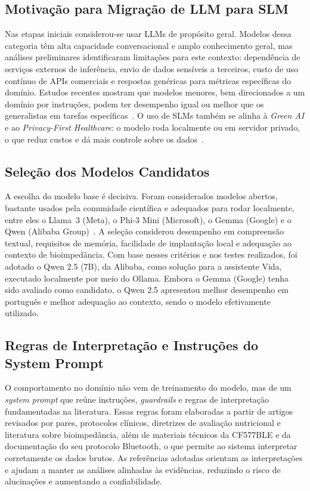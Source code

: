\subsection{Motivação para Migração de LLM para SLM}

Nas etapas iniciais considerou-se usar LLMs de propósito geral. Modelos dessa categoria têm
alta capacidade conversacional e amplo conhecimento geral, mas análises preliminares
identificaram limitações para este contexto: dependência de serviços externos de inferência,
envio de dados sensíveis a terceiros, custo de uso contínuo de APIs comerciais e respostas
genéricas para métricas específicas do domínio. Estudos recentes mostram que modelos menores,
bem direcionados a um domínio por instruções, podem ter desempenho igual ou melhor que os
generalistas em
tarefas específicas~\cite{abdin2024,gemma2024,bai2023}. O uso de SLMs também se alinha à
\emph{Green AI} e ao \emph{Privacy-First Healthcare}: o modelo roda localmente ou em
servidor privado, o que reduz custos e dá mais controle sobre os dados~\cite{schwartz2020,etic2024}.

\subsection{Seleção dos Modelos Candidatos}

A escolha do modelo base é decisiva. Foram considerados modelos abertos, bastante usados
pela comunidade científica e adequados para rodar localmente, entre eles o Llama~3 (Meta),
o Phi-3 Mini (Microsoft), o Gemma (Google) e o Qwen (Alibaba
Group)~\cite{touvron2024,abdin2024,gemma2024,bai2023}. A seleção considerou desempenho em
compreensão textual, requisitos de memória, facilidade de implantação local e adequação ao
contexto de bioimpedância. Com base nesses critérios e nos testes realizados, foi adotado o
Qwen 2.5 (7B), da Alibaba, como solução para a assistente Vida, executado localmente por
meio do Ollama. Embora o Gemma (Google) tenha sido avaliado como candidato, o Qwen 2.5
apresentou melhor desempenho em português e melhor adequação ao contexto, sendo o modelo
efetivamente utilizado.

\subsection{Regras de Interpretação e Instruções do System Prompt}

O comportamento no domínio não vem de treinamento do modelo, mas de um \emph{system prompt}
que reúne instruções, \emph{guardrails} e regras de interpretação fundamentadas na
literatura. Essas regras foram elaboradas a partir de artigos revisados por pares, protocolos
clínicos, diretrizes de avaliação nutricional e literatura sobre bioimpedância, além de
materiais técnicos da CF577BLE e da documentação do seu protocolo Bluetooth, o que permite ao
sistema interpretar corretamente os dados brutos. As referências adotadas orientam as
interpretações e ajudam a manter as análises alinhadas às evidências, reduzindo o risco de
alucinações e aumentando a confiabilidade.

